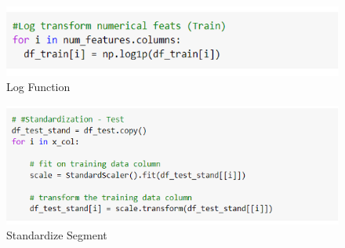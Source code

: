 \documentclass[sigplan,screen]{acmart}
\begin{document}
\begin{figure}[H]
\centering
\includegraphics[width=\columnwidth]{log.png}
\caption{Log Function} \label{log_funct}
\end{figure}


\begin{figure}[H]
\centering
\includegraphics[width=\columnwidth]{standardize.png}
\caption{Standardize Segment}\label{standarization}
\end{figure}
\end{document}
